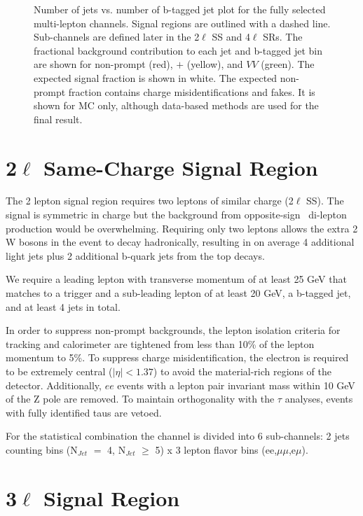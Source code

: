 \begin{figure}[!t]
\begin{tabular}{ccc}
\end{tabular} 
\caption{Number of jets vs. number of b-tagged jet plot for the fully selected multi-lepton channels. Signal regions
are outlined with a dashed line. Sub-channels are defined later in the 2$\ell$ SS and 4$\ell$ SRs. The fractional
background contribution to each jet and b-tagged jet bin are shown for non-prompt (red), \ttV $+$ \tZ (yellow), and $VV$ (green). The expected signal 
fraction is shown in white. The expected non-prompt fraction contains charge misidentifications and fakes. It is shown for MC only, although
data-based methods are used for the final result.
}
\label{figure:selection}
\end{figure}

\section{2$\ell$ Same-Charge Signal Region}

The 2 lepton signal region requires two leptons of similar charge (2$\ell$ SS). The signal is symmetric in charge but
the background from opposite-sign \ttbar\ di-lepton production would be overwhelming. Requiring
only two leptons allows the extra 2 W bosons in the event to decay hadronically, resulting in on average 4 additional
light jets plus 2 additional b-quark jets from the top decays. 

We require a leading lepton with transverse momentum of at least 25 GeV that matches to a
trigger and a sub-leading lepton of at least 20 GeV, a b-tagged jet, and at least 4 jets in
total.  

In order to suppress non-prompt backgrounds, the lepton isolation criteria for tracking and 
calorimeter are tightened from less than 10\% of the lepton momentum to 5\%. To suppress
charge misidentification, the electron is required to be extremely central ($|\eta| < 1.37$) 
to avoid the material-rich regions of the detector. Additionally, $ee$ events with a 
lepton pair invariant mass within 10 GeV of the Z pole are removed. To maintain orthogonality with the $\tau$ analyses, events with fully identified
taus are vetoed.

For the statistical combination the channel is divided into 6 sub-channels:
2 jets counting bins (N$_{Jet}$ $=$ 4, N$_{Jet}$ $\geq$ 5) x 3 lepton flavor bins (ee,$\mu\mu$,e$\mu$). 


\section{3$\ell$ Signal Region}

